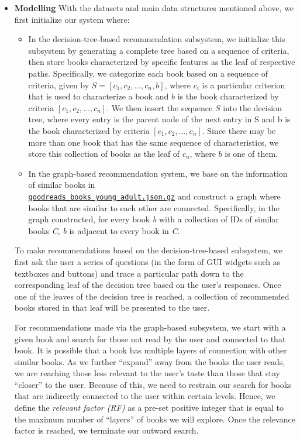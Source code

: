 \documentclass[fontsize=11pt]{article}
\begin{document}
\begin{itemize}
\item \textbf{Modelling }With the datasets and main data structures mentioned above, we first initialize our system where:
\begin{itemize}
\item In the decision-tree-based recommendation subsystem, we initialize this subsystem by generating a complete tree based on a sequence of criteria, then store books characterized by specific features as the leaf of respective paths. Specifically, we categorize each book based on a sequence of criteria, given by $S = [c_1, c_2, …, c_n, b]$, where $c_i$ is a particular criterion that is used to characterize a book and $b$ is the book characterized by criteria $[c_1, c_2, …, c_n]$. We then insert the sequence $S$ into the decision tree, where every entry is the parent node of the next entry in S and b is the book characterized by criteria  $[c_1, c_2, …, c_n]$. Since there may be more than one book that has the same sequence of characteristics, we store this collection of books as the leaf of $c_n$, where $b$ is one of them.
\item  In the graph-based recommendation system, we base on the information of similar books in \\\texttt{\href{https://drive.google.com/uc?id=1gH7dG4yQzZykTpbHYsrw2nFknjUm0Mol}{goodreads\_books\_young\_adult.json.gz}} and construct a graph where books that are similar to each other are connected. Specifically, in the graph constructed, for every book \textit{b} with a collection of IDs of similar books \textit{C}, \textit{b} is adjacent to every book in \textit{C}.
\end{itemize}
To make recommendations based on the decision-tree-based subsystem, we first ask the user a series of questions (in the form of GUI widgets such as textboxes and buttons) and trace a particular path down to the corresponding leaf of the decision tree based on the user’s responses. Once one of the leaves of the decision tree is reached, a collection of recommended books stored in that leaf will be presented to the user.

For recommendations made via the graph-based subsystem, we start with a given book and search for those not read by the user and connected to that book. It is possible that a book has multiple layers of connection with other similar books. As we further “expand” away from the books the user reads, we are reaching those less relevant to the user’s taste than those that stay “closer” to the user. Because of this, we need to restrain our search for books that are indirectly connected to the user within certain levels. Hence, we define the \textit{relevant factor (RF)} as a pre-set positive integer that is equal to the maximum number of “layers” of books we will explore. Once the relevance factor is reached, we terminate our outward search.


\end{itemize}
\end{document}
